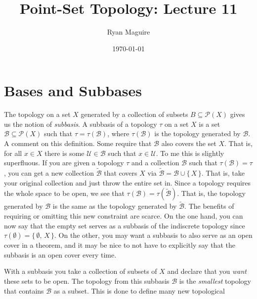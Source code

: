 \documentclass{article}
\title{Point-Set Topology: Lecture 11}
\author{Ryan Maguire}
\date{\today}
\theoremstyle{plain}
\theoremstyle{normal}
\newenvironment{definition}{%
    \pushQED{\qed}\renewcommand{\qedsymbol}{$\blacksquare$}\definitionx%
}{%
    \popQED\enddefinitionx%
}
\begin{document}
    \maketitle
    \section{Bases and Subbases}
        The topology on a set $X$ generated by a collection of subsets
        $B\subseteq\mathcal{P}(X)$ gives us the notion of \textit{subbasis}.
        \begin{definition}[\textbf{Subbasis of a Topology}]
            A subbasis of a topology $\tau$ on a set $X$ is a set
            $\mathcal{B}\subseteq\mathcal{P}(X)$ such that
            $\tau=\tau(\mathcal{B})$, where $\tau(\mathcal{B})$
            is the topology generated by $\mathcal{B}$.
        \end{definition}
        A comment on this definition. Some require that $\mathcal{B}$ also
        covers the set $X$. That is, for all $x\in{X}$ there is some
        $\mathcal{U}\in\mathcal{B}$ such that $x\in\mathcal{U}$. To me this is
        slightly superfluous. If you are given a topology $\tau$ and a
        collection $\mathcal{B}$ such that $\tau(\mathcal{B})=\tau$, you can
        get a new collection $\tilde{\mathcal{B}}$ that covers $X$ via
        $\tilde{\mathcal{B}}=\mathcal{B}\cup\{\,X\,\}$. That is, take your
        original collection and just throw the entire set in. Since a topology
        requires the whole space to be open, we see that
        $\tau(\mathcal{B})=\tau(\tilde{\mathcal{B}})$. That is, the topology
        generated by $\mathcal{B}$ is the same as the topology generated by
        $\tilde{\mathcal{B}}$. The benefits of requiring or omitting this
        new constraint are scarce. On the one hand, you can now say that the
        empty set serves as a subbasis of the indiscrete topology since
        $\tau(\emptyset)=\{\,\emptyset,\,X\,\}$. On the other, you may want
        a subbasis to also serve as an open cover in a theorem, and it may be
        nice to not have to explicitly say that the subbasis is an open cover
        every time.
        \par\hfill\par
        With a subbasis you take a collection of subsets of $X$ and declare that
        you \textit{want} these sets to be open. The topology from this subbasis
        $\mathcal{B}$ is the \textit{smallest} topology that contains
        $\mathcal{B}$ as a subset. This is done to define many new topological
\end{document}

